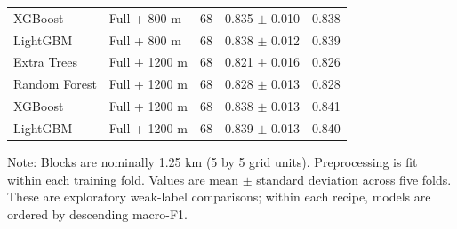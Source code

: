 \begin{table}[!htbp]
{\begin{tabular}{llrrr}
XGBoost & Full + 800 m & 68 & 0.835 $\pm$ 0.010 & 0.838 \\
LightGBM & Full + 800 m & 68 & 0.838 $\pm$ 0.012 & 0.839 \\
Extra Trees & Full + 1200 m & 68 & 0.821 $\pm$ 0.016 & 0.826 \\
Random Forest & Full + 1200 m & 68 & 0.828 $\pm$ 0.013 & 0.828 \\
XGBoost & Full + 1200 m & 68 & 0.838 $\pm$ 0.013 & 0.841 \\
LightGBM & Full + 1200 m & 68 & 0.839 $\pm$ 0.013 & 0.840 \\
\bottomrule
\end{tabular}%
}
\begin{minipage}{0.96\textwidth}\vspace{2pt}\scriptsize Note: Blocks are nominally 1.25 km (5 by 5 grid units). Preprocessing is fit within each training fold. Values are mean $\pm$ standard deviation across five folds. These are exploratory weak-label comparisons; within each recipe, models are ordered by descending macro-F1.\end{minipage}
\end{table}
